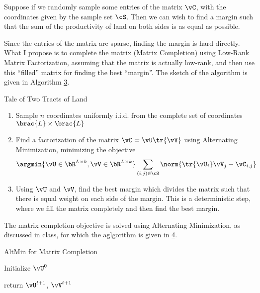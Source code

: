 \documentclass{article}
\begin{document}
\begin{question}

	Suppose if we randomly sample some entries of the matrix $\vC$, with the coordinates given by the sample set $\cS$. Then we can wish to find a margin such that the sum of the productivity of land on both sides is as equal as possible.

	Since the entries of the matrix are sparse, finding the margin is hard directly. What I propose is to complete the matrix (Matrix Completion) using Low-Rank Matrix Factorization, assuming that the matrix is actually low-rank, and then use this ``filled'' matrix for finding the best ``margin''. The sketch of the algorithm is given in Algorithm \hyperlink{algo:3}{3}.

	\begin{algo}[0.9\textwidth]{Tale of Two Tracts of Land}

		\begin{enumerate}
			\item Sample $n$ coordinates uniformly i.i.d. from the complete set of coordinates $\brac{L} \times \brac{L}$
			\item Find a factorization of the matrix $\vC = \vU \tr{\vV}$ using Alternating Minimization, minimizing the objective
				\begin{align*}
					\argmin{\vU \in \bR^{L \times k}, \vV \in \bR^{L \times k}} \sum_{(i, j) \in \cS} \norm{\tr{\vU_i} \vV_j  - \vC_{i, j}}
				\end{align*}
			\item Using $\vU$ and $\vV$, find the best margin which divides the matrix such that there is equal weight on each side of the margin. This is a deterministic step, where we fill the matrix completely and then find the best margin.
		\end{enumerate}

	\end{algo}


	The matrix completion objective is solved using Alternating Minimization, as discussed in class, for which the aglgorithm is given in \hyperlink{algo:4}{4}.

	\begin{algo}[0.9\textwidth]{AltMin for Matrix Completion}

		\begin{algorithm}[H]
			\IncMargin{1em}
			\Indm
			 \sbr
			 \sbr
			\Indp
			Initialize $\vU^0$

			return $\vU^{t + 1}$, $\vV^{t + 1}$
		\end{algorithm}

	\end{algo}

\end{question}



\end{document}
